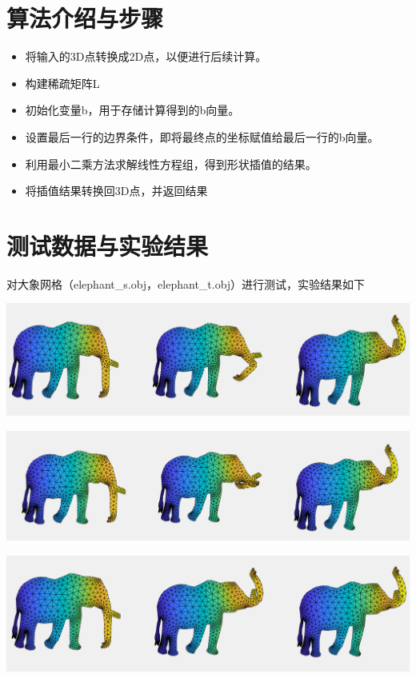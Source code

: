 \documentclass{article}
\begin{document}
\section{算法介绍与步骤}
\begin{itemize}
    \item 将输入的3D点转换成2D点，以便进行后续计算。

    \item 构建稀疏矩阵L
    
    \item 初始化变量b，用于存储计算得到的b向量。

    
    \item 设置最后一行的边界条件，即将最终点的坐标赋值给最后一行的b向量。
    
    \item 利用最小二乘方法求解线性方程组，得到形状插值的结果。
    
    \item 将插值结果转换回3D点，并返回结果
\end{itemize}



\section{测试数据与实验结果}
对大象网格（elephant\_s.obj，elephant\_t.obj）进行测试，实验结果如下

\includegraphics[width=0.7\linewidth]{0.png}

\includegraphics[width=0.7\linewidth]{1.png}

\includegraphics[width=0.7\linewidth]{2.png}
\end{document}
